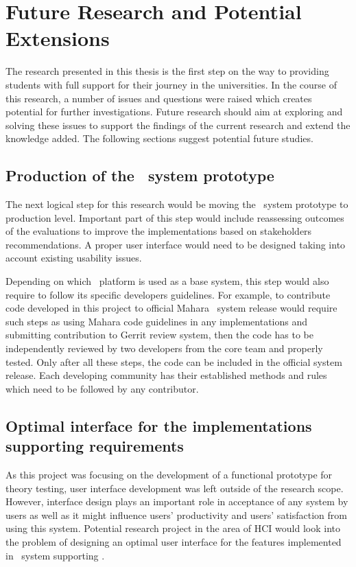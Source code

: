 \section{Future Research and Potential Extensions}
The research presented in this thesis is the first step on the way to providing
students with full support for their \LLLs journey in the universities. In the
course of this research, a number of issues and questions were raised which
creates potential for further investigations. Future research should aim at
exploring and solving these issues to support the findings of the current
research and extend the knowledge added. The following sections suggest
potential future studies.

\subsection{Production of the \ep~system prototype}
The next logical step for this research would be moving the \ep~system prototype
to production level. Important part of this step would include reassessing
outcomes of the evaluations to improve the implementations based on stakeholders
recommendations. A proper user interface would need to be designed taking into
account existing usability issues. 

Depending on which \ep~platform is used as a base system, this step would also
require to follow its specific developers guidelines. For example, to contribute
code developed in this project to official Mahara \ep~system release would
require such steps as using Mahara code guidelines in any implementations and
submitting contribution to Gerrit review system, then the code has to be
independently reviewed by two developers from the core team and properly tested.
Only after all these steps, the code can be included in the official system
release. Each developing community has their established methods and rules which
need to be followed by any contributor.

\subsection[Optimal interface design]{Optimal interface for the implementations
supporting \LLLs requirements} 

As this project was focusing on the development of a functional prototype for
theory testing, user interface development was left outside of the research
scope. However, interface design plays an important role in acceptance of any
system by users as well as it might influence users' productivity and users'
satisfaction from using this system. Potential research project in the area of
HCI would look into the problem of designing an optimal user interface for the
features implemented in \ep~system supporting \LLLsn.

